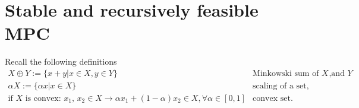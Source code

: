\setcounter{section}{0}
\section{Stable and recursively feasible MPC}
Recall the following definitions
\begin{align*}
    X\oplus Y := \{x+y|x\in X, y \in Y\} \quad&\text{Minkowski sum of $X$ and $Y$},\\
    \alpha X := \{\alpha x|x \in X\} \quad &\text{scaling of a set},\\
    \text{if $X$ is convex: $x_1$, $x_2\in X\rightarrow \alpha x_1+(1-\alpha)x_2\in X, \forall \alpha\in[0,1]$}\quad &\text{convex set}.
\end{align*}
